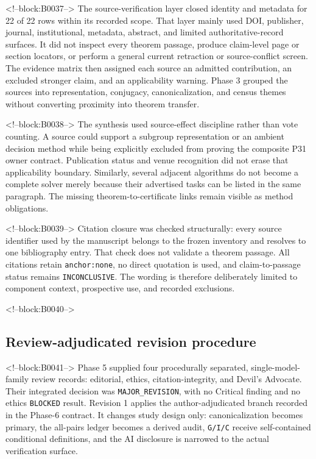 \documentclass[11pt]{article}
\begin{document}
<!--block:B0037-->
The source-verification layer closed identity and metadata for 22 of 22
rows within its recorded scope. That layer mainly used DOI, publisher,
journal, institutional, metadata, abstract, and limited
authoritative-record surfaces. It did not inspect every theorem passage,
produce claim-level page or section locators, or perform a general
current retraction or source-conflict screen. The evidence matrix then
assigned each source an admitted contribution, an excluded stronger
claim, and an applicability warning. Phase 3 grouped the sources into
representation, conjugacy, canonicalization, and census themes without
converting proximity into theorem transfer.

<!--block:B0038-->
The synthesis used source-effect discipline rather than vote counting.
A source could support a subgroup representation or an ambient decision
method while being explicitly excluded from proving the composite P31
owner contract. Publication status and venue recognition did not erase
that applicability boundary. Similarly, several adjacent algorithms do
not become a complete solver merely because their advertised tasks can
be listed in the same paragraph. The missing theorem-to-certificate
links remain visible as method obligations.

<!--block:B0039-->
Citation closure was checked structurally: every source identifier used
by the manuscript belongs to the frozen inventory and resolves to one
bibliography entry. That check does not validate a theorem passage. All
citations retain \texttt{anchor:none}, no direct quotation is used, and
claim-to-passage status remains \texttt{INCONCLUSIVE}. The wording is
therefore deliberately limited to component context, prospective use,
and recorded exclusions.

<!--block:B0040-->
\hypertarget{32-review-adjudicated-revision-procedure}{%
\subsection{Review-adjudicated revision
procedure}\label{32-review-adjudicated-revision-procedure}}

<!--block:B0041-->
Phase 5 supplied four procedurally separated, single-model-family review
records: editorial, ethics, citation-integrity, and Devil's Advocate.
Their integrated decision was \texttt{MAJOR\_REVISION}, with no Critical
finding and no ethics \texttt{BLOCKED} result. Revision 1 applies the
author-adjudicated branch recorded in the Phase-6 contract. It changes
study design only: canonicalization becomes primary, the all-pairs
ledger becomes a derived audit, \texttt{G/I/C} receive self-contained
conditional definitions, and the AI disclosure is narrowed to the actual
verification surface.
\end{document}
